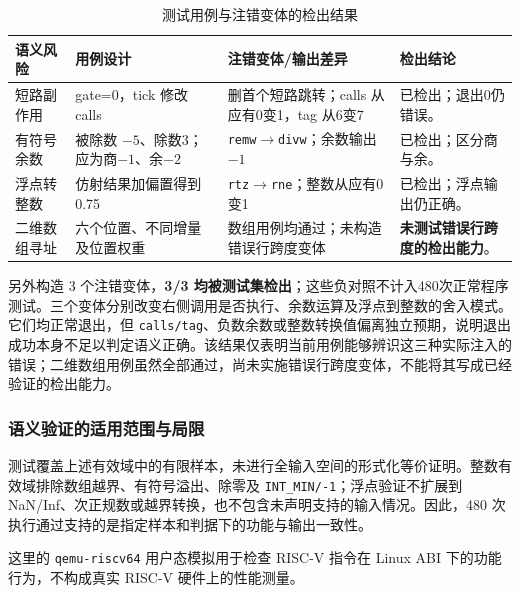 \begin{table}[H]
\centering\small
\caption{测试用例与注错变体的检出结果}
\label{tab:cases}
\begin{tabularx}{\textwidth}{L{2.05cm}L{3.75cm}L{3.7cm}Y}
\toprule{}语义风险 & 用例设计 & 注错变体/输出差异 & 检出结论 \\
\midrule
短路副作用 & gate=0，tick 修改 calls & 删首个短路跳转；calls 从应有0变1，tag 从6变7 & 已检出；退出0仍错误。\\
有符号余数 & 被除数 $-5$、除数3；应为商$-1$、余$-2$ & \texttt{remw}$\to$\texttt{divw}；余数输出$-1$ & 已检出；区分商与余。\\
浮点转整数 & 仿射结果加偏置得到0.75 & \texttt{rtz}$\to$\texttt{rne}；整数从应有0变1 & 已检出；浮点输出仍正确。\\
二维数组寻址 & 六个位置、不同增量及位置权重 & 数组用例均通过；未构造错误行跨度变体 & \textbf{未测试错误行跨度的检出能力}。\\
\bottomrule
\end{tabularx}
\end{table}

另外构造 3 个注错变体，\textbf{3/3 均被测试集检出}；这些负对照不计入480次正常程序测试。三个变体分别改变右侧调用是否执行、余数运算及浮点到整数的舍入模式。它们均正常退出，但 \texttt{calls/tag}、负数余数或整数转换值偏离独立预期，说明退出成功本身不足以判定语义正确。该结果仅表明当前用例能够辨识这三种实际注入的错误；二维数组用例虽然全部通过，尚未实施错误行跨度变体，不能将其写成已经验证的检出能力。

\subsubsection{语义验证的适用范围与局限}
\label{sec:sysy-validation-limits}
测试覆盖上述有效域中的有限样本，未进行全输入空间的形式化等价证明。整数有效域排除数组越界、有符号溢出、除零及 \texttt{INT\_MIN/-1}；浮点验证不扩展到 NaN/Inf、次正规数或越界转换，也不包含未声明支持的输入情况。因此，480 次执行通过支持的是指定样本和判据下的功能与输出一致性。

这里的 \texttt{qemu-riscv64} 用户态模拟用于检查 RISC-V 指令在 Linux ABI 下的功能行为，不构成真实 RISC-V 硬件上的性能测量\cite{qemu}。
